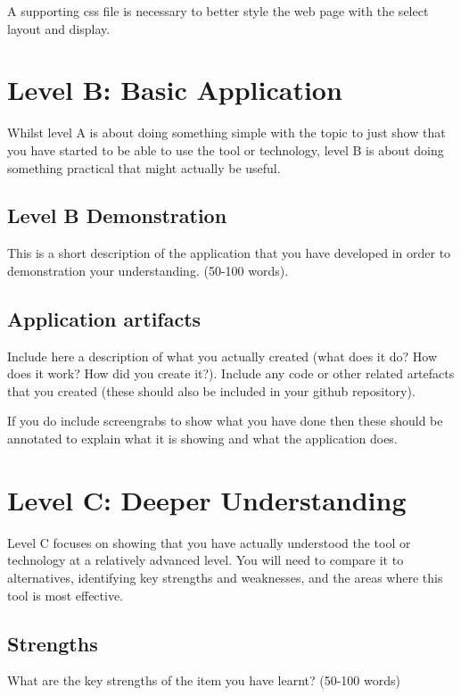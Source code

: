 \documentclass[a4paper, 11pt]{report}
\begin{document}
A supporting css file is necessary to better style the web page with the select layout and display. 



\newpage
\section{Level B: Basic Application}

Whilst level A is about doing something simple with the topic to just show that you have started to be able to use the tool or technology, level B is about doing something practical that might actually be useful.

\subsection{Level B Demonstration}

This is a short description of the application that you have developed in order to demonstration your understanding. (50-100 words).

\subsection{Application artifacts}

Include here a description of what you actually created (what does it do? How does it work? How did you create it?). Include any code or other related artefacts that you created (these should also be included in your github repository).

If you do include screengrabs to show what you have done then these should be annotated to explain what it is showing and what the application does.



\newpage
\section{Level C: Deeper Understanding}

Level C focuses on showing that you have actually understood the tool or technology at a relatively advanced level. You will need to compare it to alternatives, identifying key strengths and weaknesses, and the areas where this tool is most effective. 

\subsection{Strengths}
What are the key strengths of the item you have learnt? (50-100 words)
\end{document}
